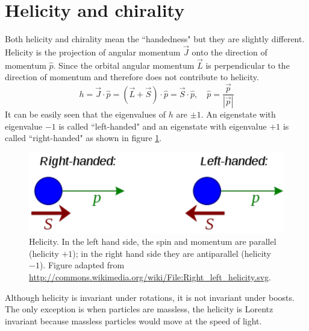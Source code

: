 \documentclass[12pt]{report}
\begin{document}
\section{Helicity and chirality}
Both helicity and chirality mean the ``handedness" but they are slightly different.
Helicity is the projection of angular momentum $\vec{J}$ onto the direction of momentum $\hat{p}$.
Since the orbital angular momentum $\vec{L}$ is perpendicular to the direction of momentum and therefore does not contribute to helicity.
\begin{equation}
h = \vec{J} \cdot \hat{p} = (\vec{L} + \vec{S}) \cdot \hat{p} = \vec{S} \cdot \hat{p}, \quad 
\hat{p} = \frac{\vec{p}}{|\vec{p}|}
\end{equation}
It can be easily seen that the eigenvalues of $h$ are $\pm 1$.
An eigenstate with eigenvalue $-1$ is called ``left-handed" and an eigenstate with eigenvalue $+1$ is called ``right-handed" as shown in figure \ref{fig: helicity}.
\begin{figure}
\centering
\includegraphics[scale=0.8]{figures/380px-Right_left_helicity.pdf}
\caption{Helicity. In the left hand side, the spin and momentum are parallel (helicity $+1$); in the right hand side they are antiparallel (helicity $-1$). Figure adapted from \url{http://commons.wikimedia.org/wiki/File:Right\_left\_helicity.svg}.}
\label{fig: helicity}
\end{figure}
Although helicity is invariant under rotations, it is not invariant under boosts.
The only exception is when particles are massless, the helicity is Lorentz invariant because massless particles would move at the speed of light.
\end{document}
